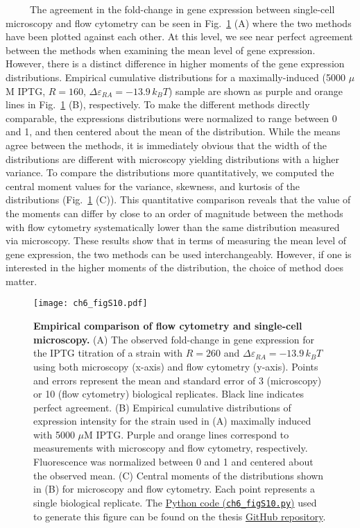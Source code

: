 \documentclass[12pt]{caltech_thesis}
\begin{document}
~~~~~The agreement in the fold-change in gene expression between
single-cell microscopy and flow cytometry can be seen in
Fig.~\ref{fig:empirical_comparison} (A) where the two methods have been
plotted against each other. At this level, we see near perfect agreement
between the methods when examining the mean level of gene expression.
However, there is a distinct difference in higher moments of the gene
expression distributions. Empirical cumulative distributions for a
maximally-induced (5000 \(\mu\)M IPTG, \(R=160\),
\(\Delta\varepsilon_{RA} = -13.9\, k_BT\)) sample are shown as purple
and orange lines in Fig.~\ref{fig:empirical_comparison} (B),
respectively. To make the different methods directly comparable, the
expressions distributions were normalized to range between 0 and 1, and
then centered about the mean of the distribution. While the means agree
between the methods, it is immediately obvious that the width of the
distributions are different with microscopy yielding distributions with
a higher variance. To compare the distributions more quantitatively, we
computed the central moment values for the variance, skewness, and
kurtosis of the distributions (Fig.~\ref{fig:empirical_comparison} (C)).
This quantitative comparison reveals that the value of the moments can
differ by close to an order of magnitude between the methods with flow
cytometry systematically lower than the same distribution measured via
microscopy. These results show that in terms of measuring the mean level
of gene expression, the two methods can be used interchangeably.
However, if one is interested in the higher moments of the distribution,
the choice of method does matter.

\hypertarget{fig:empirical_comparison}{%
\begin{figure}
\centering
\texttt{[image: ch6\_figS10.pdf]}
\caption[{Empirical comparison of flow cytometry and single-cell
microscopy.}]{\textbf{Empirical comparison of flow cytometry and
single-cell microscopy.} (A) The observed fold-change in gene expression
for the IPTG titration of a strain with \(R=260\) and
\(\Delta\varepsilon_{RA} = -13.9\, k_BT\) using both microscopy (x-axis)
and flow cytometry (y-axis). Points and errors represent the mean and
standard error of 3 (microscopy) or 10 (flow cytometry) biological
replicates. Black line indicates perfect agreement. (B) Empirical
cumulative distributions of expression intensity for the strain used in
(A) maximally induced with 5000 \(\mu\)M IPTG. Purple and orange lines
correspond to measurements with microscopy and flow cytometry,
respectively. Fluorescence was normalized between 0 and 1 and centered
about the observed mean. (C) Central moments of the distributions shown
in (B) for microscopy and flow cytometry. Each point represents a single
biological replicate. The
\href{https://github.com/gchure/phd/blob/master/src/chapter_06/code/ch6_figS10.py}{Python
code (\texttt{ch6\_figS10.py})} used to generate this figure can be
found on the thesis \href{https://github.com/gchure/phd}{GitHub
repository}.}
\label{fig:empirical_comparison}
\end{figure}
}
\end{document}
